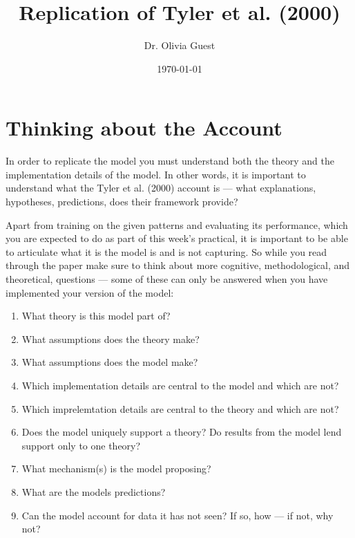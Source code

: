 \documentclass[a4paper,10pt]{article}
\title{Replication of Tyler et al. (2000)}
\author{Dr. Olivia Guest}
\date{\today}
\begin{document}
\maketitle
\section{Thinking about the Account}
In order to replicate the model you must understand both the theory and the implementation details of the model. In other words, it is important to understand what the Tyler et al. (2000) account is --- what explanations, hypotheses, predictions, does their framework provide?

Apart from training on the given patterns and evaluating its performance, which you are expected to do as part of this week's practical, it is important to be able to articulate what it is the model is and is not capturing.
So while you read through the paper make sure to think about more cognitive, methodological, and theoretical, questions --- some of these can only be answered when you have implemented your version of the model:
\begin{enumerate}


 \item What theory is this model part of?
 \item What assumptions does the theory make? 
 \item What assumptions does the model make? 
 \item Which implementation details are central to the model and which are not? 
 \item Which imprelemtation details are central to the theory and which are not? 
 \item Does the model uniquely support a theory? Do results from the model lend support only to one theory? 
 \item  What mechanism(s) is the model proposing?
 \item   What are the models predictions? 

\item Can the model account for data it has not seen? If so, how --- if not, why not? 

\end{enumerate}
\end{document}
